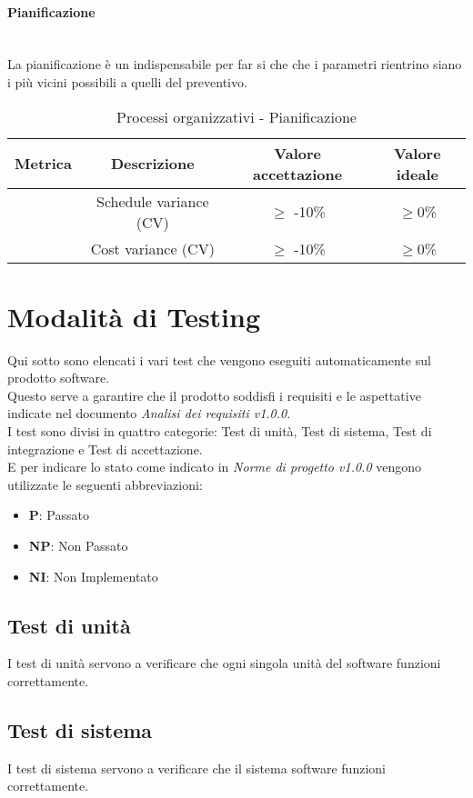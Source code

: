 \documentclass[11pt]{article}
\begin{document}
\begin{justify}
\paragraph{Pianificazione}\mbox{}\\
La pianificazione è un indispensabile per far si che che i parametri rientrino siano i più vicini possibili a quelli del preventivo.\\
\begin{table}[H]
  \centering
\begin{tabular}{|c|c|c|c|}
  \hline
  \textbf{Metrica} & \textbf{Descrizione} & \textbf{Valore accettazione} & \textbf{Valore ideale}\\
  \hline
  & Schedule variance (CV) & $\geq$ -10\% & $\geq$0\% \\
  \hline
  & Cost variance (CV) & $\geq$ -10\% & $\geq$0\% \\
  \hline
\end{tabular}
\caption{Processi organizzativi - Pianificazione}
\label{tab:pianificazione}
\end{table}

\section{Modalità di Testing}
Qui sotto sono elencati i vari test che vengono eseguiti automaticamente sul prodotto software.\\
Questo serve a garantire che il prodotto soddisfi i requisiti e le aspettative indicate nel documento \textit{Analisi dei requisiti v1.0.0}.\\
I test sono divisi in quattro categorie: Test di unità, Test di sistema, Test di integrazione e Test di accettazione.\\
E per indicare lo stato come indicato in \textit{Norme di progetto v1.0.0} vengono utilizzate le seguenti abbreviazioni:
\begin{itemize}
\item \textbf{P}: Passato
\item \textbf{NP}: Non Passato
\item \textbf{NI}: Non Implementato
\end{itemize}
\subsection{Test di unità}
I test di unità servono a verificare che ogni singola unità del software funzioni correttamente.\\
\subsection{Test di sistema}
I test di sistema servono a verificare che il sistema software funzioni correttamente.\\

\end{justify}
\end{document}
